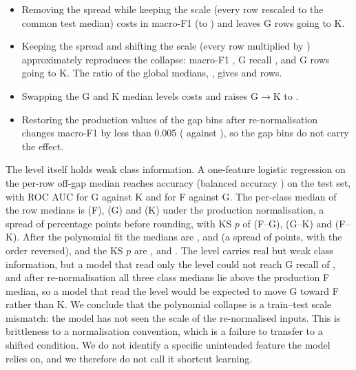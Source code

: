 \documentclass[11pt,a4paper]{article}
\begin{document}
\begin{itemize}
\item Removing the spread while keeping the scale (every row rescaled to the common test median) costs \sdCostCommon{} in macro-F1 (to \sdCommonMacroF) and leaves \sdCommonGtoK{} G rows going to K.
\item Keeping the spread and shifting the scale (every row multiplied by \sdUniMult) approximately reproduces the collapse: macro-F1 \sdUniNineMacroF, G recall \sdUniNineRecG, and \sdUniNineGtoK{} G rows going to K. The ratio of the global medians, \sdBestMult, gives \sdUniBestMacroF{} and \sdUniBestGtoK{} rows.
\item Swapping the G and K median levels costs \sdCostSwap{} and raises G$\to$K to \sdSwapGtoK.
\item Restoring the production values of the gap bins after re-normalisation changes macro-F1 by less than 0.005 (\sdPolyGapMacroF{} against \sdPolyMacroF), so the gap bins do not carry the effect.
\end{itemize}
The level itself holds weak class information. A one-feature logistic regression on the per-row off-gap median reaches accuracy \oneAcc{} (balanced accuracy \oneBal) on the test set, with ROC AUC \oneAucGK{} for G against K and \oneAucFG{} for F against G. The per-class median of the row medians is \medProdF{} (F), \medProdG{} (G) and \medProdK{} (K) under the production normalisation, a spread of \spreadProd{} percentage points before rounding, with KS $p$ of \ksProdFG{} (F--G), \ksProdGK{} (G--K) and \ksProdFK{} (F--K). After the polynomial fit the medians are \medPolyF, \medPolyG{} and \medPolyK{} (a spread of \spreadPoly{} points, with the order reversed), and the KS $p$ are \ksPolyFG, \ksPolyGK{} and \ksPolyFK. The level carries real but weak class information, but a model that read only the level could not reach G recall of \sdProdRecG, and after re-normalisation all three class medians lie above the production F median, so a model that read the level would be expected to move G toward F rather than K. We conclude that the polynomial collapse is a train--test scale mismatch: the model has not seen the scale of the re-normalised inputs. This is brittleness to a normalisation convention, which is a failure to transfer to a shifted condition. We do not identify a specific unintended feature the model relies on, and we therefore do not call it shortcut learning.
\end{document}
